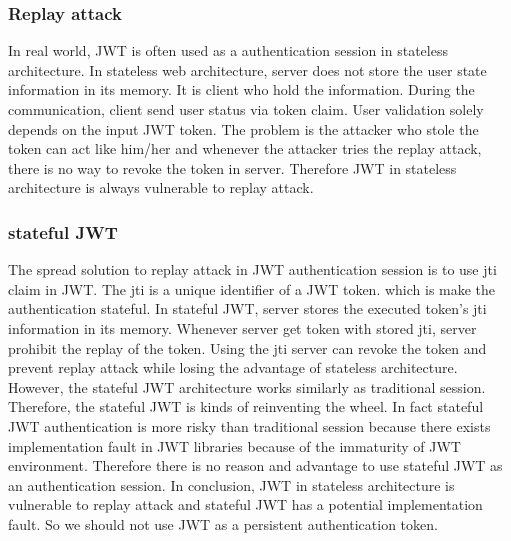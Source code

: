 \documentclass[journal,article,submit,moreauthors,pdftex,10pt,a4paper]{mdpi}
\begin{document}
\subsubsection{Replay attack}

In real world, JWT is often used as a authentication session in stateless architecture. In stateless web architecture, server does not store the user state information in its memory. It is client who hold the information. During the communication, client send user status via token claim. User validation solely depends on the input JWT token. The problem is the attacker who stole the token can act like him/her and whenever the attacker tries the replay attack, there is no way to revoke the token in server. Therefore JWT in stateless architecture is always vulnerable to replay attack.

\subsubsection{stateful JWT}

The spread solution to replay attack in JWT authentication session is to use jti claim in JWT. The jti is a unique identifier of a JWT token. which is make the authentication stateful. In stateful JWT, server stores the executed token's jti information in its memory. Whenever server get token with stored jti, server prohibit the replay of the token. Using the jti server can revoke the token and prevent replay attack while losing the advantage of stateless architecture. However, the stateful JWT architecture works similarly as traditional session. Therefore, the stateful JWT is kinds of reinventing the wheel. In fact stateful JWT authentication is more risky than traditional session because there exists implementation fault in JWT libraries because of the immaturity of JWT environment. Therefore there is no reason and advantage to use stateful JWT as an authentication session. In conclusion, JWT in stateless architecture is vulnerable to replay attack and stateful JWT has a potential implementation fault. So we should not use JWT as a persistent authentication token.


\end{document}
